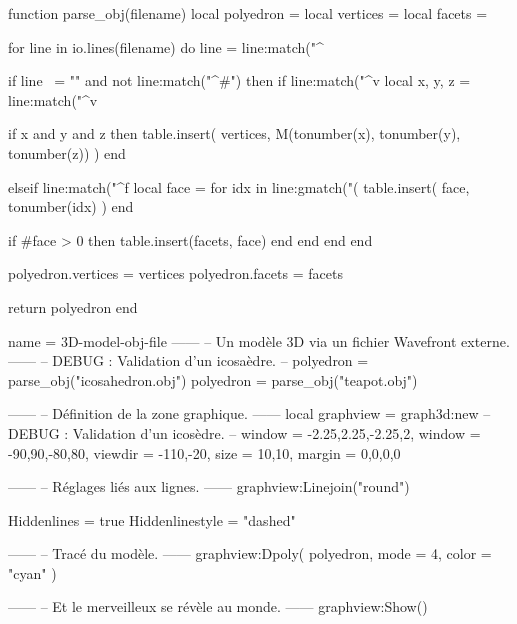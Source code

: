 \documentclass{standalone}
\begin{document}
\begin{luacode}
function parse_obj(filename)
  local polyedron = {}
  local vertices  = {}
  local facets     = {}

  for line in io.lines(filename) do
    line = line:match("^%

    if line ~= "" and not line:match("^#") then
      if line:match("^v%
        local x, y, z = line:match("^v%

        if x and y and z then
          table.insert(
            vertices,
            M(tonumber(x), tonumber(y), tonumber(z))
          )
        end

      elseif line:match("^f%
        local face = {}
        for idx in line:gmatch("(%
          table.insert(
            face,
            tonumber(idx)
          )
        end

        if #face > 0 then
          table.insert(facets, face)
        end
      end
    end
  end

  polyedron.vertices = vertices
  polyedron.facets   = facets

  return polyedron
end
\end{luacode}


\begin{luadraw}{name = 3D-model-obj-file}
------
-- Un modèle 3D via un fichier Wavefront externe.
------
-- DEBUG : Validation d'un icosaèdre.
-- polyedron = parse_obj("icosahedron.obj")
polyedron = parse_obj("teapot.obj")

------
-- Définition de la zone graphique.
------
local graphview = graph3d:new{
-- DEBUG : Validation d'un icosèdre.
--   window  = {-2.25,2.25,-2.25,2},
  window  = {-90,90,-80,80},
  viewdir = {-110,-20},
  size    = {10,10},
  margin  = {0,0,0,0}
}

------
-- Réglages liés aux lignes.
------
graphview:Linejoin("round")

Hiddenlines     = true
Hiddenlinestyle = "dashed"

------
-- Tracé du modèle.
------
graphview:Dpoly(
  polyedron,
  {
    mode  = 4,
    color = "cyan"
  })

------
-- Et le merveilleux se révèle au monde.
------
graphview:Show()
\end{luadraw}
\end{document}
